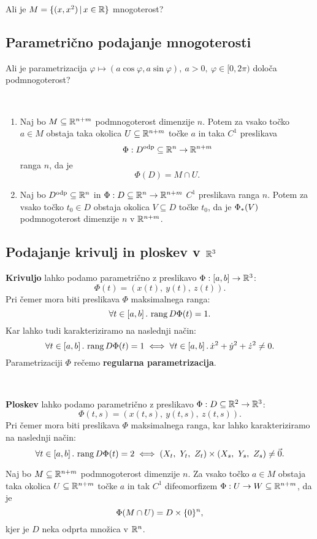 \begin{zgled}
    Ali je \(M = \{(x, x^2) \,|\, x \in \mathbb{R}\}\) mnogoterost?
\end{zgled}

\subsection{Parametrično podajanje mnogoterosti}

\begin{zgled}
    Ali je parametrizacija $\varphi \mapsto (a \cos \varphi, a \sin \varphi), \ a > 0, \ \varphi \in [0, 2 \pi)$ določa podmnogoterost?
\end{zgled}

\begin{trditev} \
    \begin{enumerate}
        \item  Naj bo \(M \subseteq \mathbb{R}^{n+m}\) podmnogoterost dimenzije \(n\). Potem za vsako točko \(a \in M\) obstaja taka okolica \(U \subseteq \mathbb{R}^{n+m}\) točke \(a\) in taka \(C^1\) preslikava 
        \[
            \Phi: D^\text{odp} \subseteq \mathbb{R}^n \to \mathbb{R}^{n+m}
        \]
        ranga \(n\), da je 
        \[
            \Phi(D) = M \cap U.
        \]
        \item Naj bo \(D^\text{odp} \subseteq \mathbb{R}^n\) in \(\Phi: D \subseteq \mathbb{R}^n \to \mathbb{R}^{n+m}\) \(C^1\) preslikava ranga \(n\). Potem za vsako točko \(t_0 \in D\) obstaja okolica \(V \subseteq D\) točke \(t_0\), da je \(\Phi_{*}(V)\) podmnogoterost dimenzije \(n\) v \(\mathbb{R}^{n+m}\).
    \end{enumerate}
\end{trditev}

\subsection{Podajanje krivulj in ploskev v \(\mathbb{R}^3\)}
\textbf{Krivuljo} lahko podamo parametrično z preslikavo \(\Phi: [a, b] \to \mathbb{R}^3\):
\[
    \Phi(t) = (x(t),\ y(t),\ z(t)).
\]
Pri čemer mora biti preslikava \(\Phi\) maksimalnega ranga:
\[
    \forall t \in [a, b]  \,.\, \operatorname{rang} D\Phi(t) = 1.
\] 
Kar lahko tudi karakteriziramo na naslednji način:
\[
    \forall t \in [a, b]  \,.\, \operatorname{rang} D\Phi(t) = 1 \iff \forall t \in [a, b]  \,.\, \dot{x}^2 + \dot{y}^2 + \dot{z}^2 \neq 0.
\]
Parametrizaciji \(\Phi\) rečemo \textbf{regularna parametrizacija}.  

\

\textbf{Ploskev} lahko podamo parametrično z preslikavo \(\Phi: D \subseteq \mathbb{R}^2 \to \mathbb{R}^3\):
\[
    \Phi(t,s) = (x(t,s),\ y(t,s),\ z(t, s)).
\]
Pri čemer mora biti preslikava \(\Phi\) maksimalnega ranga, kar lahko karakteriziramo na naslednji način:
\[
    \forall t \in [a, b]  \,.\, \operatorname{rang} D\Phi(t) = 2 \iff (X_t,\ Y_t,\ Z_t) \times (X_s,\ Y_s,\ Z_s) \neq \vec{0}.
\] 
\begin{trditev}
    Naj bo \(M \subseteq \mathbb{R}^{n+m}\) podmnogoterost dimenzije \(n\). Za vsako točko \(a \in M\) obstaja taka okolica \(U \subseteq \mathbb{R}^{n+m}\) točke \(a\) in tak \(C^1\) difeomorfizem \(\Phi: U \to W \subseteq \mathbb{R}^{n+m}\), da je 
    \[
        \Phi(M \cap U) = D \times \{0\}^n,
    \] 
    kjer je \(D\) neka odprta množica v \(\mathbb{R}^n\).
\end{trditev}

